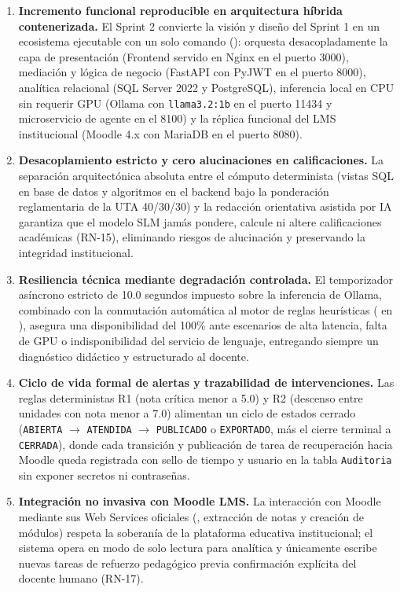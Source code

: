 \documentclass[11pt,a4paper]{article}
\begin{document}
\begin{enumerate}
  \item \textbf{Incremento funcional reproducible en arquitectura híbrida contenerizada.} El Sprint 2 convierte la visión y diseño del Sprint 1 en un ecosistema ejecutable con un solo comando (): orquesta desacopladamente la capa de presentación (Frontend servido en Nginx en el puerto 3000), mediación y lógica de negocio (FastAPI con PyJWT en el puerto 8000), analítica relacional (SQL Server 2022 y PostgreSQL), inferencia local en CPU sin requerir GPU (Ollama con \texttt{llama3.2:1b} en el puerto 11434 y microservicio de agente en el 8100) y la réplica funcional del LMS institucional (Moodle 4.x con MariaDB en el puerto 8080).
  \item \textbf{Desacoplamiento estricto y cero alucinaciones en calificaciones.} La separación arquitectónica absoluta entre el cómputo determinista (vistas SQL en base de datos y algoritmos en el backend bajo la ponderación reglamentaria de la UTA 40/30/30) y la redacción orientativa asistida por IA garantiza que el modelo SLM jamás pondere, calcule ni altere calificaciones académicas (RN-15), eliminando riesgos de alucinación y preservando la integridad institucional.
  \item \textbf{Resiliencia técnica mediante degradación controlada.} El temporizador asíncrono estricto de 10.0 segundos impuesto sobre la inferencia de Ollama, combinado con la conmutación automática al motor de reglas heurísticas ( en ), asegura una disponibilidad del 100\% ante escenarios de alta latencia, falta de GPU o indisponibilidad del servicio de lenguaje, entregando siempre un diagnóstico didáctico y estructurado al docente.
  \item \textbf{Ciclo de vida formal de alertas y trazabilidad de intervenciones.} Las reglas deterministas R1 (nota crítica menor a 5.0) y R2 (descenso entre unidades con nota menor a 7.0) alimentan un ciclo de estados cerrado (\texttt{ABIERTA} $\rightarrow$ \texttt{ATENDIDA} $\rightarrow$ \texttt{PUBLICADO} o \texttt{EXPORTADO}, más el cierre terminal a \texttt{CERRADA}), donde cada transición y publicación de tarea de recuperación hacia Moodle queda registrada con sello de tiempo y usuario en la tabla \texttt{Auditoria} sin exponer secretos ni contraseñas.
  \item \textbf{Integración no invasiva con Moodle LMS.} La interacción con Moodle mediante sus Web Services oficiales (, extracción de notas y creación de módulos) respeta la soberanía de la plataforma educativa institucional; el sistema opera en modo de solo lectura para analítica y únicamente escribe nuevas tareas de refuerzo pedagógico previa confirmación explícita del docente humano (RN-17).

\end{enumerate}
\end{document}
